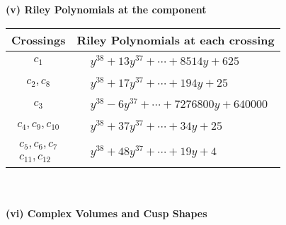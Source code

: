 \documentclass[1p]{elsarticle_modified}
\theoremstyle{definition}
\begin{document}
\newpage\renewcommand{\arraystretch}{1}
\flushleft \textbf{(v) Riley Polynomials at the component}\newline \\
\begin{tabular}{m{50pt}|m{274pt}}
Crossings & \hspace{64pt}Riley Polynomials at each crossing \\
\hline $$\begin{aligned}c_{1}\end{aligned}$$&$\begin{aligned}
&y^{38}+13 y^{37}+\cdots+8514 y+625
\end{aligned}$\\
\hline $$\begin{aligned}c_{2},c_{8}\end{aligned}$$&$\begin{aligned}
&y^{38}+17 y^{37}+\cdots+194 y+25
\end{aligned}$\\
\hline $$\begin{aligned}c_{3}\end{aligned}$$&$\begin{aligned}
&y^{38}-6 y^{37}+\cdots+7276800 y+640000
\end{aligned}$\\
\hline $$\begin{aligned}c_{4},c_{9},c_{10}\end{aligned}$$&$\begin{aligned}
&y^{38}+37 y^{37}+\cdots+34 y+25
\end{aligned}$\\
\hline $$\begin{aligned}c_{5},c_{6},c_{7}\\c_{11},c_{12}\end{aligned}$$&$\begin{aligned}
&y^{38}+48 y^{37}+\cdots+19 y+4
\end{aligned}$\\
\hline
\end{tabular}\\~\\
\newpage\flushleft \textbf{(vi) Complex Volumes and Cusp Shapes}
\end{document}
